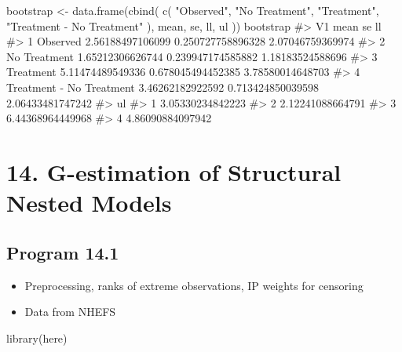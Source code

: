 \documentclass[
  10pt,
  a4paper,
]{book}
\newenvironment{Shaded}{\begin{snugshade}}{\end{snugshade}}
\newcommand{\CommentTok}[1]{\textcolor[rgb]{0.37,0.37,0.37}{#1}}
\newcommand{\FunctionTok}[1]{\textcolor[rgb]{0.28,0.35,0.67}{#1}}
\newcommand{\NormalTok}[1]{\textcolor[rgb]{0.00,0.46,0.62}{#1}}
\newcommand{\OtherTok}[1]{\textcolor[rgb]{0.00,0.46,0.62}{#1}}
\newcommand{\StringTok}[1]{\textcolor[rgb]{0.13,0.47,0.30}{#1}}
\providecommand{\tightlist}{%
  \setlength{\itemsep}{0pt}\setlength{\parskip}{0pt}}
\begin{document}
\begin{Shaded}
\begin{Highlighting}[]
\NormalTok{bootstrap }\OtherTok{\textless{}{-}}
  \FunctionTok{data.frame}\NormalTok{(}\FunctionTok{cbind}\NormalTok{(}
    \FunctionTok{c}\NormalTok{(}
      \StringTok{"Observed"}\NormalTok{,}
      \StringTok{"No Treatment"}\NormalTok{,}
      \StringTok{"Treatment"}\NormalTok{,}
      \StringTok{"Treatment {-} No Treatment"}
\NormalTok{    ),}
\NormalTok{    mean,}
\NormalTok{    se,}
\NormalTok{    ll,}
\NormalTok{    ul}
\NormalTok{  ))}
\NormalTok{bootstrap}
\CommentTok{\#\textgreater{}                         V1             mean                se               ll}
\CommentTok{\#\textgreater{} 1                 Observed 2.56188497106099 0.250727758896328 2.07046759369974}
\CommentTok{\#\textgreater{} 2             No Treatment 1.65212306626744 0.239947174585882 1.18183524588696}
\CommentTok{\#\textgreater{} 3                Treatment 5.11474489549336 0.678045494452385 3.78580014648703}
\CommentTok{\#\textgreater{} 4 Treatment {-} No Treatment 3.46262182922592 0.713424850039598 2.06433481747242}
\CommentTok{\#\textgreater{}                 ul}
\CommentTok{\#\textgreater{} 1 3.05330234842223}
\CommentTok{\#\textgreater{} 2 2.12241088664791}
\CommentTok{\#\textgreater{} 3 6.44368964449968}
\CommentTok{\#\textgreater{} 4 4.86090884097942}
\end{Highlighting}
\end{Shaded}

\chapter*{14. G-estimation of Structural Nested Models}\label{g-estimation-of-structural-nested-models}

\section{Program 14.1}\label{program-14.1}

\begin{itemize}
\tightlist
\item
  Preprocessing, ranks of extreme observations, IP weights for censoring
\item
  Data from NHEFS
\end{itemize}

\begin{Shaded}
\begin{Highlighting}[]
\FunctionTok{library}\NormalTok{(here)}
\end{Highlighting}
\end{Shaded}
\end{document}
